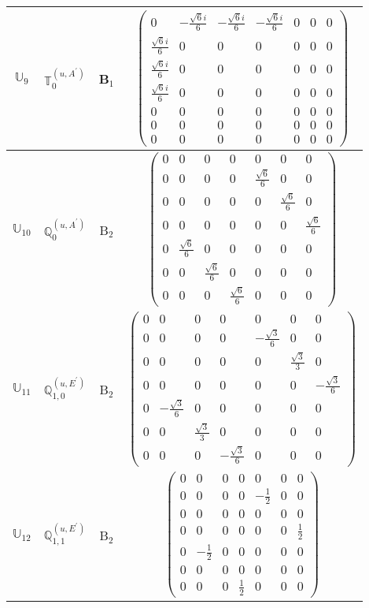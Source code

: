 \documentclass[fleqn,10pt,landscape]{article}
\begin{document}
\begin{itemize}
\begin{center}
\begin{longtable}{c|c|c|c}
$ \mathbb{U}_{9} $ & $\mathbb{T}_{0}^{(u,A^{\prime})}$ & B$_{1}$ & $\begin{pmatrix} 0 & - \frac{\sqrt{6} i}{6} & - \frac{\sqrt{6} i}{6} & - \frac{\sqrt{6} i}{6} & 0 & 0 & 0 \\ \frac{\sqrt{6} i}{6} & 0 & 0 & 0 & 0 & 0 & 0 \\ \frac{\sqrt{6} i}{6} & 0 & 0 & 0 & 0 & 0 & 0 \\ \frac{\sqrt{6} i}{6} & 0 & 0 & 0 & 0 & 0 & 0 \\ 0 & 0 & 0 & 0 & 0 & 0 & 0 \\ 0 & 0 & 0 & 0 & 0 & 0 & 0 \\ 0 & 0 & 0 & 0 & 0 & 0 & 0 \end{pmatrix}$ \\ \hline
$ \mathbb{U}_{10} $ & $\mathbb{Q}_{0}^{(u,A^{\prime})}$ & B$_{2}$ & $\begin{pmatrix} 0 & 0 & 0 & 0 & 0 & 0 & 0 \\ 0 & 0 & 0 & 0 & \frac{\sqrt{6}}{6} & 0 & 0 \\ 0 & 0 & 0 & 0 & 0 & \frac{\sqrt{6}}{6} & 0 \\ 0 & 0 & 0 & 0 & 0 & 0 & \frac{\sqrt{6}}{6} \\ 0 & \frac{\sqrt{6}}{6} & 0 & 0 & 0 & 0 & 0 \\ 0 & 0 & \frac{\sqrt{6}}{6} & 0 & 0 & 0 & 0 \\ 0 & 0 & 0 & \frac{\sqrt{6}}{6} & 0 & 0 & 0 \end{pmatrix}$ \\
$ \mathbb{U}_{11} $ & $\mathbb{Q}_{1,0}^{(u,E^{\prime})}$ & B$_{2}$ & $\begin{pmatrix} 0 & 0 & 0 & 0 & 0 & 0 & 0 \\ 0 & 0 & 0 & 0 & - \frac{\sqrt{3}}{6} & 0 & 0 \\ 0 & 0 & 0 & 0 & 0 & \frac{\sqrt{3}}{3} & 0 \\ 0 & 0 & 0 & 0 & 0 & 0 & - \frac{\sqrt{3}}{6} \\ 0 & - \frac{\sqrt{3}}{6} & 0 & 0 & 0 & 0 & 0 \\ 0 & 0 & \frac{\sqrt{3}}{3} & 0 & 0 & 0 & 0 \\ 0 & 0 & 0 & - \frac{\sqrt{3}}{6} & 0 & 0 & 0 \end{pmatrix}$ \\
$ \mathbb{U}_{12} $ & $\mathbb{Q}_{1,1}^{(u,E^{\prime})}$ & B$_{2}$ & $\begin{pmatrix} 0 & 0 & 0 & 0 & 0 & 0 & 0 \\ 0 & 0 & 0 & 0 & - \frac{1}{2} & 0 & 0 \\ 0 & 0 & 0 & 0 & 0 & 0 & 0 \\ 0 & 0 & 0 & 0 & 0 & 0 & \frac{1}{2} \\ 0 & - \frac{1}{2} & 0 & 0 & 0 & 0 & 0 \\ 0 & 0 & 0 & 0 & 0 & 0 & 0 \\ 0 & 0 & 0 & \frac{1}{2} & 0 & 0 & 0 \end{pmatrix}$ \\

\end{longtable}
\end{center}
\end{itemize}
\end{document}
